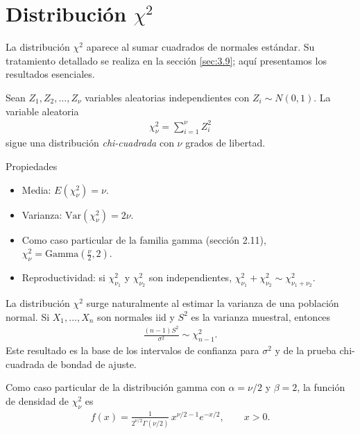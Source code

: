 \section{Distribución $\chi^2$}

La distribuci\'on $\chi^2$ aparece al sumar cuadrados de normales est\'andar. Su
tratamiento detallado se realiza en la secci\'on \ref{sec:3.9}; aqu\'i presentamos
los resultados esenciales.

\begin{definicion}
Sean $Z_1, Z_2, \ldots, Z_\nu$ variables aleatorias independientes con $Z_i \sim N(0,1)$.
La variable aleatoria
\begin{align}
 \label{eq:3.2.11}
 \chi^2_\nu = \sum_{i=1}^\nu Z_i^2
\end{align}
sigue una distribuci\'on \emph{chi-cuadrada} con $\nu$ grados de libertad.
\end{definicion}

{Propiedades}
\begin{itemize}
 \item Media: $E(\chi^2_\nu) = \nu$.
 \item Varianza: $\text{Var}(\chi^2_\nu) = 2\nu$.
 \item Como caso particular de la familia gamma (secci\'on 2.11),
 $\chi^2_\nu = \text{Gamma}\!\left(\frac{\nu}{2}, 2\right)$.
 \item Reproductividad: si $\chi^2_{\nu_1}$ y $\chi^2_{\nu_2}$ son independientes,
 $\chi^2_{\nu_1} + \chi^2_{\nu_2} \sim \chi^2_{\nu_1 + \nu_2}$.
\end{itemize}

\begin{observacion}
La distribuci\'on $\chi^2$ surge naturalmente al estimar la varianza de una poblaci\'on
normal. Si $X_1, \ldots, X_n$ son normales iid y $S^2$ es la varianza muestral,
entonces
\begin{align}
 \frac{(n-1)S^2}{\sigma^2} \sim \chi^2_{n-1}.
\end{align}
Este resultado es la base de los intervalos de confianza para $\sigma^2$ y de la
prueba chi-cuadrada de bondad de ajuste.
\end{observacion}

\begin{definicion}
 \label{eq:5.3.1}
Como caso particular de la distribuci\'on gamma con $\alpha=\nu/2$ y $\beta=2$, la
funci\'on de densidad de $\chi^2_\nu$ es
\begin{align}
 f(x) = \frac{1}{2^{\nu/2}\Gamma(\nu/2)}\,x^{\nu/2-1}e^{-x/2}, \qquad x > 0.
\end{align}
\end{definicion}

